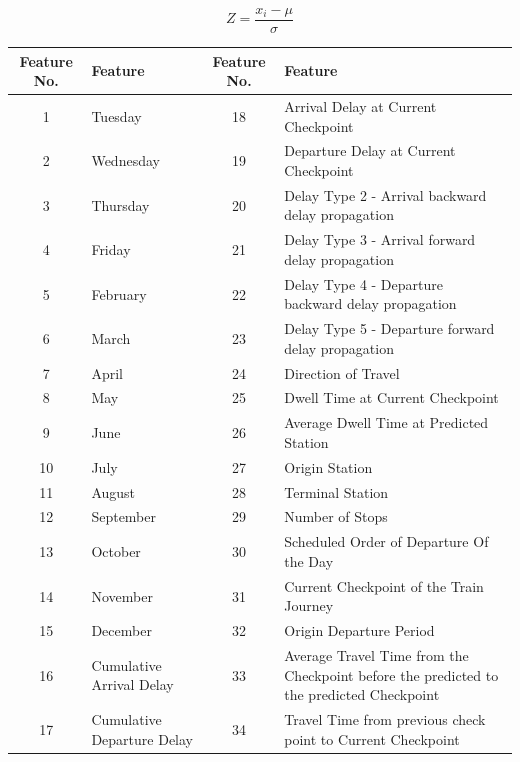 \documentclass[]{interact}
\theoremstyle{plain}%
\theoremstyle{definition}
\theoremstyle{remark}
\begin{document}
\begin{equation}
    Z = \frac{x_i-\mu}{\sigma}
\label{Equation:ScaleScore}
\end{equation}

\begin{table}[H]
{\begin{tabular}{clcl}\hline
Feature No. & Feature & Feature No. & Feature \\ \hline
1 & Tuesday & 18 & Arrival Delay at Current Checkpoint\\
2 & Wednesday & 19 & Departure Delay at Current Checkpoint\\
3 & Thursday & 20 & Delay Type 2 - Arrival backward delay propagation\\
4 & Friday & 21 & Delay Type 3 - Arrival forward delay propagation\\
5 & February & 22 & Delay Type 4 - Departure backward delay propagation\\
6 & March & 23 & Delay Type 5 - Departure forward delay propagation\\
7 & April & 24 & Direction of Travel \\
8 & May & 25 & Dwell Time at Current Checkpoint\\
9 & June & 26 & Average Dwell Time at Predicted Station\\
10 & July & 27 & Origin Station\\
11 & August & 28 & Terminal Station\\
12 & September & 29 & Number of Stops\\
13 & October & 30 & Scheduled Order of Departure Of the Day\\
14 & November & 31 & Current Checkpoint of the Train Journey\\
15 & December & 32 & Origin Departure Period\\
16 & Cumulative Arrival Delay & 33 & Average Travel Time from the Checkpoint before the predicted to the predicted Checkpoint\\
17 & Cumulative Departure Delay & 34 & Travel Time from previous check point to Current Checkpoint\\
\bottomrule
\end{tabular}}
\label{table:FinalInputKey}
\end{table}
\end{document}
